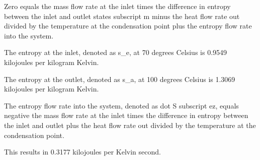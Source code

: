 Zero equals the mass flow rate at the inlet times the difference in entropy between the inlet and outlet states subscript m minus the heat flow rate out divided by the temperature at the condensation point plus the entropy flow rate into the system.

The entropy at the inlet, denoted as s_e, at 70 degrees Celsius is 0.9549 kilojoules per kilogram Kelvin.

The entropy at the outlet, denoted as s_a, at 100 degrees Celsius is 1.3069 kilojoules per kilogram Kelvin.

The entropy flow rate into the system, denoted as dot S subscript ez, equals negative the mass flow rate at the inlet times the difference in entropy between the inlet and outlet plus the heat flow rate out divided by the temperature at the condensation point.

This results in 0.3177 kilojoules per Kelvin second.